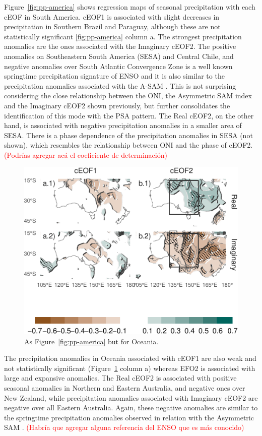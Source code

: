 \documentclass[smallextended]{svjour3}       %
\begin{document}
Figure~\ref{fig:pp-america} shows regression maps of seasonal precipitation with each cEOF in South America. cEOF1 is associated with slight decreases in precipitation in Southern Brazil and Paraguay, although these are not statistically significant \ref{fig:pp-america} column a. The strongest precipitation anomalies are the ones associated with the Imaginary cEOF2. The positive anomalies on Southeastern South America (SESA) and Central Chile, and negative anomalies over South Atlantic Convergence Zone is a well known springtime precipitation signature of ENSO \citep{cai2020a} and it is also similar to the precipitation anomalies associated with the A-SAM \citep{campitelli2021}. This is not surprising considering the close relationship between the ONI, the Asymmetric SAM index and the Imaginary cEOF2 shown previously, but further consolidates the identification of this mode with the PSA pattern. The Real cEOF2, on the other hand, is associated with negative precipitation anomalies in a smaller area of SESA. There is a phase dependence of the precipitation anomalies in SESA (not shown), which resembles the relationship between ONI and the phase of cEOF2. \textcolor{red}{(Podrías agregar acá el coeficiente de determinación)}



\begin{figure}
\centering
\includegraphics{../figures/pp-oceania-1.pdf}
\caption{\label{fig:pp-oceania}As Figure~\ref{fig:pp-america} but for Oceania.}
\end{figure}

The precipitation anomalies in Oceania associated with cEOF1 are also weak and not statistically significant (Figure~\ref{fig:pp-oceania} column a) whereas EFO2 is associated with large and expansive anomalies. The Real cEOF2 is associated with positive seasonal anomalies in Northern and Eastern Australia, and negative ones over New Zealand, while precipitation anomalies associated with Imaginary cEOF2 are negative over all Eastern Australia. Again, these negative anomalies are similar to the springtime precipitation anomalies observed in relation with the Asymmetric SAM \citep{campitelli2021}.
\textcolor{red}{(Habría que agregar alguna referencia del ENSO que es más conocido)}
\end{document}
